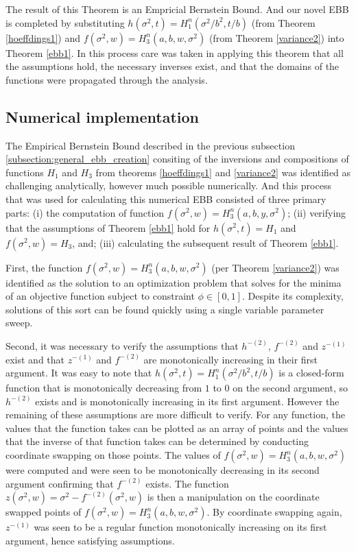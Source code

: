 The result of this Theorem is an Empricial Bernstein Bound. And our novel EBB is completed by substituting  $h(\sigma^2,t)=H_1^n\left(\sigma^2/b^2,t/b\right)$ (from Theorem \ref{hoeffdings1}) and $f(\sigma^2,w)=H_3^n\left(a,b,w,\sigma^2\right)$ (from Theorem \ref{variance2}) into Theorem \ref{ebb1}.
In this process care was taken in applying this theorem that all the assumptions hold, the necessary inverses exist, and that the domains of the functions were propagated through the analysis.




\subsection{Numerical implementation}\label{numerical-implementation}

The Empirical Bernstein Bound described in the previous subsection \ref{subsection:general_ebb_creation} consiting of the inversions and compositions of functions $H_1$ and $H_3$ from theorems \ref{hoeffdings1} and \ref{variance2} was identified as challenging analytically, however much possible numerically.
And this process that was used for calculating this numerical EBB consisted of three primary parts:
(i) the computation of function $f(\sigma^2,w)=H_3^n(a,b,y,\sigma^2)$;
(ii) verifying that the assumptions of Theorem \ref{ebb1} hold for $h(\sigma^2,t)=H_1$ and $f(\sigma^2,w)=H_3$, and;
(iii) calculating the subsequent result of Theorem \ref{ebb1}.

First, the function $f(\sigma^2,w)=H_3^n(a,b,w,\sigma^2)$ (per Theorem \ref{variance2}) was identified as the solution to an optimization problem that solves for the minima of an objective function subject to constraint $\phi\in[0,1]$.
Despite its complexity, solutions of this sort can be found quickly using a single variable parameter sweep.

Second, it was necessary to verify the assumptions that $h^{-(2)}$, $f^{-(2)}$ and $z^{-(1)}$ exist and that $z^{-(1)}$ and $f^{-(2)}$ are monotonically increasing in their first argument.
It was easy to note that $h(\sigma^2,t)=H_1^n\left(\sigma^2/b^2,t/b\right)$ is a closed-form function that is monotonically decreasing from $1$ to $0$ on the second argument, so $h^{-(2)}$ exists and is monotonically increasing in its first argument.  However the remaining of these assumptions are more difficult to verify.
For any function, the values that the function takes can be plotted as an array of points and the values that the inverse of that function takes can be determined by conducting coordinate swapping on those points.
The values of $f(\sigma^2,w)=H_3^n(a,b,w,\sigma^2)$ were computed and were seen to be monotonically decreasing in its second argument confirming that $f^{-(2)}$ exists.
The function $z(\sigma^2,w)=\sigma^2-f^{-(2)}\left(\sigma^2,w\right)$ is then a manipulation on the coordinate swapped points of $f(\sigma^2,w)=H_3^n(a,b,w,\sigma^2)$.
By coordinate swapping again, $z^{-(1)}$ was seen to be a regular function monotonically increasing on its first argument, hence satisfying assumptions.


